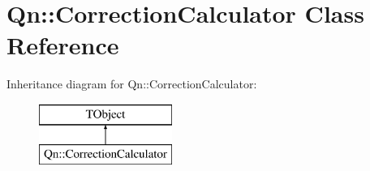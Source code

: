 \hypertarget{classQn_1_1CorrectionCalculator}{}\section{Qn\+:\+:Correction\+Calculator Class Reference}
\label{classQn_1_1CorrectionCalculator}
Inheritance diagram for Qn\+:\+:Correction\+Calculator\+:\begin{figure}[H]
\begin{center}
\leavevmode
\includegraphics[height=2.000000cm]{classQn_1_1CorrectionCalculator}
\end{center}
\end{figure}
